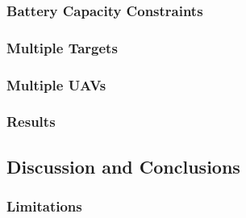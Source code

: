 \subsubsection{Battery Capacity Constraints}

\subsubsection{Multiple Targets}

\subsubsection{Multiple UAVs}

\subsubsection{Results}

\subsection{Discussion and Conclusions}
\subsubsection{Limitations}
